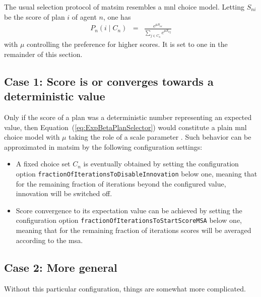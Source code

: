 The usual selection protocol of \gls{matsim} resembles a \gls{mnl}
choice model. Letting $S_{ni}$ be the score of plan $i$ of agent
$n$, one has
\begin{eqnarray}
P_{n}(i\mid C_{n}) & = & \frac{e^{\mu S_{ni}}}{\sum_{j\in C_{n}}e^{\mu S_{nj}}}\label{eq:ExpBetaPlanSelector}
\end{eqnarray}
with $\mu$ controlling the preference for higher scores.
It is set to one in the remainder of this section. 

\subsection{Case 1: Score is or converges towards a deterministic value}

Only if the score
of a plan was a deterministic number representing an expected value, 
then Equation~(\ref{eq:ExpBetaPlanSelector}) would constitute a plain \gls{mnl} choice model with $\mu$ taking the role
of a scale parameter \citep[see, e.g.,][p.45]{Train_2003}. 
Such behavior 
can be approximated in \acrshort{matsim} by the following configuration settings:
\begin{itemize}
\styleItemize
\item A fixed choice set $C_n$ is eventually obtained by setting the configuration option \verb$fractionOfIterationsToDisableInnovation$ below one,  
meaning that for the remaining fraction of iterations beyond the configured value, innovation will be switched off.
\item Score convergence to its expectation value can be achieved by setting the configuration option \verb$fractionOfIterationsToStartScoreMSA$ below one, 
meaning that for the remaining fraction of iterations scores will be averaged according to the \acrfull{msa}.
\end{itemize}
%

\subsection{Case 2: More general}

Without this particular configuration, things are somewhat more complicated.

